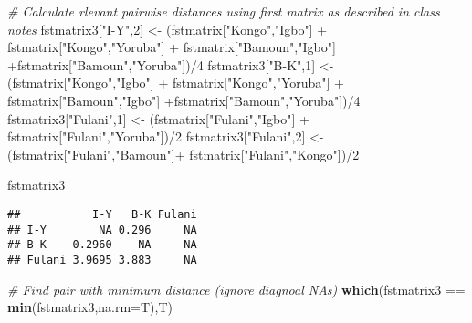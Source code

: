 \documentclass[]{article}
\newenvironment{Shaded}{\begin{snugshade}}{\end{snugshade}}
\newcommand{\KeywordTok}[1]{\textcolor[rgb]{0.13,0.29,0.53}{\textbf{{#1}}}}
\newcommand{\DataTypeTok}[1]{\textcolor[rgb]{0.13,0.29,0.53}{{#1}}}
\newcommand{\DecValTok}[1]{\textcolor[rgb]{0.00,0.00,0.81}{{#1}}}
\newcommand{\StringTok}[1]{\textcolor[rgb]{0.31,0.60,0.02}{{#1}}}
\newcommand{\CommentTok}[1]{\textcolor[rgb]{0.56,0.35,0.01}{\textit{{#1}}}}
\newcommand{\NormalTok}[1]{{#1}}
\begin{document}
\begin{Shaded}
\begin{Highlighting}[]
\CommentTok{# Calculate rlevant pairwise distances using first matrix as described in class notes}
\NormalTok{fstmatrix3[}\StringTok{"I-Y"}\NormalTok{,}\DecValTok{2}\NormalTok{] <-}\StringTok{ }\NormalTok{(fstmatrix[}\StringTok{"Kongo"}\NormalTok{,}\StringTok{"Igbo"}\NormalTok{] +}\StringTok{ }\NormalTok{fstmatrix[}\StringTok{"Kongo"}\NormalTok{,}\StringTok{"Yoruba"}\NormalTok{] +}\StringTok{ }
\StringTok{                          }\NormalTok{fstmatrix[}\StringTok{"Bamoun"}\NormalTok{,}\StringTok{"Igbo"}\NormalTok{] +fstmatrix[}\StringTok{"Bamoun"}\NormalTok{,}\StringTok{"Yoruba"}\NormalTok{])/}\DecValTok{4}
\NormalTok{fstmatrix3[}\StringTok{"B-K"}\NormalTok{,}\DecValTok{1}\NormalTok{] <-}\StringTok{ }\NormalTok{(fstmatrix[}\StringTok{"Kongo"}\NormalTok{,}\StringTok{"Igbo"}\NormalTok{] +}\StringTok{ }\NormalTok{fstmatrix[}\StringTok{"Kongo"}\NormalTok{,}\StringTok{"Yoruba"}\NormalTok{] +}\StringTok{ }
\StringTok{                          }\NormalTok{fstmatrix[}\StringTok{"Bamoun"}\NormalTok{,}\StringTok{"Igbo"}\NormalTok{] +fstmatrix[}\StringTok{"Bamoun"}\NormalTok{,}\StringTok{"Yoruba"}\NormalTok{])/}\DecValTok{4}
\NormalTok{fstmatrix3[}\StringTok{"Fulani"}\NormalTok{,}\DecValTok{1}\NormalTok{] <-}\StringTok{ }\NormalTok{(fstmatrix[}\StringTok{"Fulani"}\NormalTok{,}\StringTok{"Igbo"}\NormalTok{] +}\StringTok{ }\NormalTok{fstmatrix[}\StringTok{"Fulani"}\NormalTok{,}\StringTok{"Yoruba"}\NormalTok{])/}\DecValTok{2}
\NormalTok{fstmatrix3[}\StringTok{"Fulani"}\NormalTok{,}\DecValTok{2}\NormalTok{] <-}\StringTok{ }\NormalTok{(fstmatrix[}\StringTok{"Fulani"}\NormalTok{,}\StringTok{"Bamoun"}\NormalTok{]+}\StringTok{ }\NormalTok{fstmatrix[}\StringTok{"Fulani"}\NormalTok{,}\StringTok{"Kongo"}\NormalTok{])/}\DecValTok{2}
\end{Highlighting}
\end{Shaded}

\pagebreak

\begin{Shaded}
\begin{Highlighting}[]
\NormalTok{fstmatrix3}
\end{Highlighting}
\end{Shaded}

\begin{verbatim}
##           I-Y   B-K Fulani
## I-Y        NA 0.296     NA
## B-K    0.2960    NA     NA
## Fulani 3.9695 3.883     NA
\end{verbatim}

\begin{Shaded}
\begin{Highlighting}[]
\CommentTok{# Find pair with minimum distance (ignore diagnoal NAs)}
\KeywordTok{which}\NormalTok{(fstmatrix3 ==}\StringTok{ }\KeywordTok{min}\NormalTok{(fstmatrix3,}\DataTypeTok{na.rm=}\NormalTok{T),T)}
\end{Highlighting}
\end{Shaded}
\end{document}
